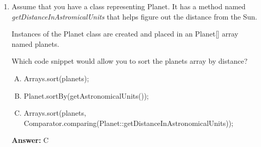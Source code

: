 \documentclass[12pt]{article}
\begin{document}
\begin{enumerate}[1.]
    \item

    Assume that you have a class representing Planet. It has a method named\\
    \textit{getDistanceInAstromicalUnits} that helps figure out the distance from the Sun.

    \bigskip

    Instances of the Planet class are created and placed in an Planet[] array named
    planets.

    \bigskip

    Which code snippet would allow you to sort the planets array by distance?

    \begin{enumerate}[A.]
        \item Arrays.sort(planets);
        \item Planet.sortBy(getAstronomicalUnits());
        \item Arrays.sort(planets, Comparator.comparing(Planet::getDistanceInAstronomicalUnits));
    \end{enumerate}

    \bigskip

    \textbf{Answer:} C

\end{enumerate}
\end{document}
